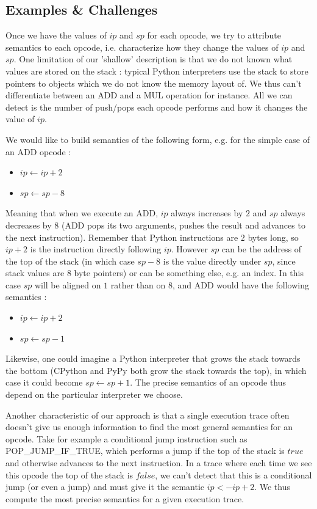 \documentclass[french]{article}
\begin{document}
\subsection{Examples \& Challenges}

Once we have the values of $ip$ and $sp$ for each opcode, we try to attribute semantics to each opcode, i.e. characterize how they change the values of $ip$ and $sp$. One limitation of our 'shallow' description is that we do not known what values are stored on the stack : typical Python interpreters use the stack to store pointers to objects which we do not know the memory layout of. We thus can't differentiate between an ADD and a MUL operation for instance. All we can detect is the number of push/pops each opcode performs and how it changes the value of $ip$.

We would like to build semantics of the following form, e.g. for the simple case of an ADD opcode :
\begin{itemize}
	\item $ip \leftarrow ip + 2$
	\item $sp \leftarrow sp - 8$
\end{itemize}
Meaning that when we execute an ADD, $ip$ always increases by $2$ and $sp$ always decreases by $8$ (ADD pops its two arguments, pushes the result and advances to the next instruction). Remember that Python instructions are $2$ bytes long, so $ip + 2$ is the instruction directly following $ip$. However $sp$ can be the address of the top of the stack (in which case $sp - 8$ is the value directly under $sp$, since stack values are $8$ byte pointers) or can be something else, e.g. an index. In this case $sp$ will be aligned on $1$ rather than on $8$, and ADD would have the following semantics :
\begin{itemize}
	\item $ip \leftarrow ip + 2$
	\item $sp \leftarrow sp - 1$
\end{itemize}
Likewise, one could imagine a Python interpreter that grows the stack towards the bottom (CPython and PyPy both grow the stack towards the top), in which case it could become $sp \leftarrow sp + 1$. The precise semantics of an opcode thus depend on the particular interpreter we choose.

Another characteristic of our approach is that a single execution trace often doesn't give us enough information to find the most general semantics for an opcode. Take for example a conditional jump instruction such as POP\_JUMP\_IF\_TRUE, which performs a jump if the top of the stack is $true$ and otherwise advances to the next instruction. In a trace where each time we see this opcode the top of the stack is $false$, we can't detect that this is a conditional jump (or even a jump) and must give it the semantic $ip <- ip + 2$. We thus compute the most precise semantics for a given execution trace. 
\end{document}
